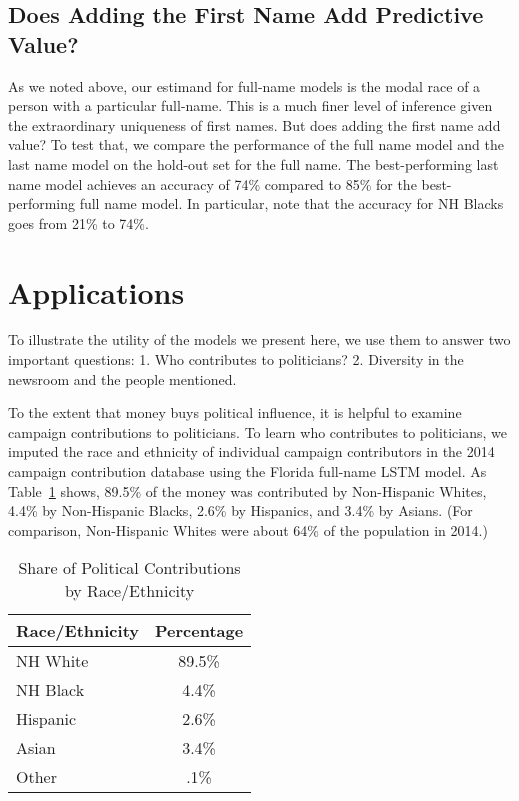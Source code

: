 \documentclass[12pt, letterpaper]{article}
\begin{document}
\subsection*{Does Adding the First Name Add Predictive Value?}

As we noted above, our estimand for full-name models is the modal race of a person with a particular full-name. This is a much finer level of inference given the extraordinary uniqueness of first names. But does adding the first name add value? To test that, we compare the performance of the full name model and the last name model on the hold-out set for the full name. The best-performing last name model achieves an accuracy of 74\% compared to 85\% for the best-performing full name model. In particular, note that the accuracy for NH Blacks goes from 21\% to 74\%.


\section*{Applications}
To illustrate the utility of the models we present here, we use them to answer two important questions: 1. Who contributes to politicians? 2. Diversity in the newsroom and the people mentioned. 

To the extent that money buys political influence, it is helpful to examine campaign contributions to politicians. To learn who contributes to politicians, we imputed the race and ethnicity of individual campaign contributors in the 2014 campaign contribution database \citep{bonica2017database} using the Florida full-name LSTM model. As Table~\ref{table:campaign} shows, 89.5\% of the money was contributed by Non-Hispanic Whites, 4.4\% by Non-Hispanic Blacks, 2.6\% by Hispanics, and 3.4\% by Asians. (For comparison, Non-Hispanic Whites were about 64\% of the population in 2014.) 

\begin{table}[ht!]
\centering
\caption{Share of Political Contributions by Race/Ethnicity}
\label{table:campaign}
\begin{tabular}{lc}
  \hline
  Race/Ethnicity & Percentage \\
  \hline
  NH White & 89.5\% \\
  NH Black & 4.4\% \\
  Hispanic & 2.6\% \\
  Asian & 3.4\% \\
  Other & .1\% \\
  \hline
\end{tabular}
\end{table}
\end{document}
